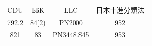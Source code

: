 \documentclass[a4paper,12pt,twoside,french]{book}
\begin{document}
\begin{center}
      \newlength{\bibentrywidth}%
      \settowidth{\bibentrywidth}{\texttt{}} %
%
	  \vspace{-1em}
      \begin{minipage}{\bibentrywidth}
	  \vspace{-1em}
      \unskip\texttt{}
      \end{minipage}

    \begin{tabular}{ c c c c }
    CDU   & ББК   &  LLC &  日本十進分類法 \\
    792.2 & 84(2) &  PN2000 & 952 \\
    821   & 83    &  PN3448.S45 & 953
    \end{tabular}




    \vfill
    \null





    \end{center}
    \restoregeometry



  \null
  \thispagestyle{empty}

  \null\vfill

\end{document}
